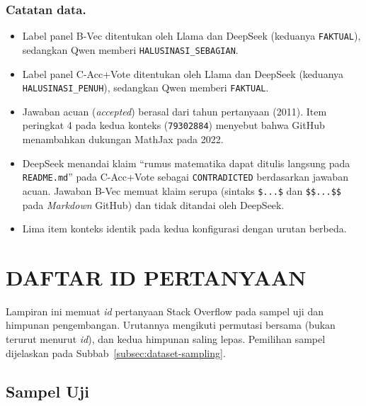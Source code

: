 \subsection{Catatan data.}
\begin{itemize}\small
\item Label panel B-Vec ditentukan oleh Llama dan DeepSeek (keduanya \texttt{FAKTUAL}), sedangkan Qwen memberi \texttt{HALUSINASI\_\allowbreak{}SEBAGIAN}.
\item Label panel C-Acc+Vote ditentukan oleh Llama dan DeepSeek (keduanya \texttt{HALUSINASI\_\allowbreak{}PENUH}), sedangkan Qwen memberi \texttt{FAKTUAL}.
\item Jawaban acuan (\emph{accepted}) berasal dari tahun pertanyaan (2011). Item peringkat 4 pada kedua konteks (\texttt{79302884}) menyebut bahwa GitHub menambahkan dukungan MathJax pada 2022.
\item DeepSeek menandai klaim ``rumus matematika dapat ditulis langsung pada \texttt{README.md}'' pada C-Acc+Vote sebagai \texttt{CONTRADICTED} berdasarkan jawaban acuan. Jawaban B-Vec memuat klaim serupa (sintaks \texttt{\$...\$} dan \texttt{\$\$...\$\$} pada \emph{Markdown} GitHub) dan tidak ditandai oleh DeepSeek.
\item Lima item konteks identik pada kedua konfigurasi dengan urutan berbeda.
\end{itemize}

\cleardoublepage
\chapter{DAFTAR ID PERTANYAAN}
\label{lamp:id}

Lampiran ini memuat \emph{id} pertanyaan Stack Overflow pada sampel uji dan himpunan pengembangan. Urutannya mengikuti permutasi bersama (bukan terurut menurut \emph{id}), dan kedua himpunan saling lepas. Pemilihan sampel dijelaskan pada Subbab~\ref{subsec:dataset-sampling}. 

\section{Sampel Uji}
\label{sec:lamp-id-uji}

\scriptsize

